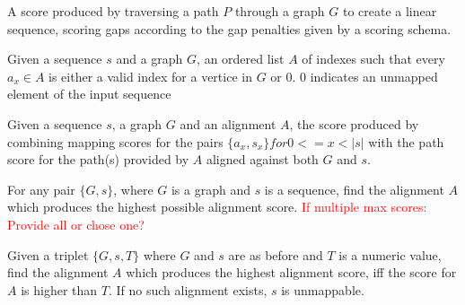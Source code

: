 \documentclass{article}
\begin{document}
\begin{defn}
  A score produced by traversing a path $P$ through a graph $G$ to create a linear sequence, scoring gaps according to the gap penalties given by a scoring schema.
\end{defn}
\begin{defn}[Alignment]
  Given a sequence $s$ and a graph $G$, an ordered list $A$ of indexes such that every $a_x \in A$ is either a valid index for a vertice in $G$ or $0$. $0$ indicates an unmapped element of the input sequence
\end{defn}
\begin{defn}
  Given a sequence $s$, a graph $G$ and an alignment $A$, the score produced by combining mapping scores for the pairs $\{a_x, s_x\} for 0<=x<|s|$ with the path score for the path(s) provided by $A$ aligned against both $G$ and $s$.
\end{defn}
\begin{defn}
  For any pair $\{G, s\}$, where $G$ is a graph and $s$ is a sequence, find the alignment $A$ which produces the highest possible alignment score.
  \textcolor{red}{If multiple max scores: Provide all or chose one?}
\end{defn}
\begin{defn}
  Given a triplet $\{G, s, T\}$ where $G$ and $s$ are as before and $T$ is a numeric value, find the alignment $A$ which produces the highest alignment score, iff the score for $A$ is higher than $T$. If no such alignment exists, $s$ is unmappable.
\end{defn}
\end{document}
